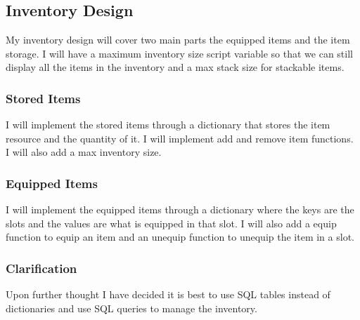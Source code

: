 \documentclass{article}
\begin{document}
        \subsection{Inventory Design}
        My inventory design will cover two main parts the equipped items and the item storage. I will have a maximum inventory size script variable so that we can still display all the items in the inventory and a max stack size for stackable items.\\
        \subsubsection{Stored Items}
        I will implement the stored items through a dictionary that stores the item resource and the quantity of it. I will implement add and remove item functions. I will also add a max inventory size.\\
        \subsubsection{Equipped Items}
        I will implement the equipped items through a dictionary where the keys are the slots and the values are what is equipped in that slot. I will also add a equip function to equip an item and an unequip function to unequip the item in a slot.\\
        \subsubsection{Clarification}
        Upon further thought I have decided it is best to use SQL tables instead of dictionaries and use SQL queries to manage the inventory.\\
\end{document}

